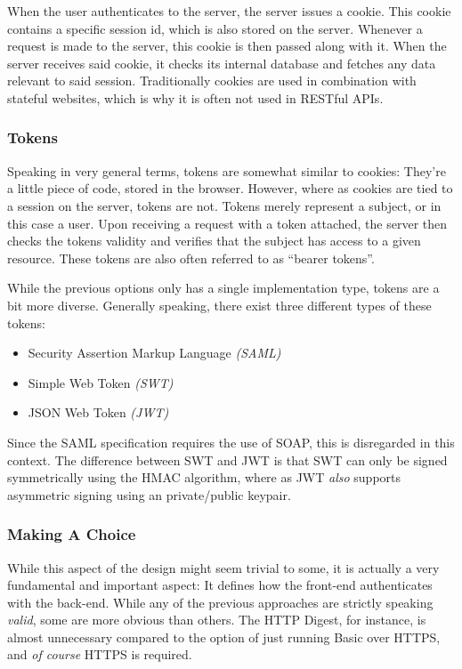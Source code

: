 				When the user authenticates to the server, the server issues a cookie. This cookie contains a specific session id, which is also stored on the server. Whenever a request is made to the server, this cookie is then passed along with it. When the server receives said cookie, it checks its internal database and fetches any data relevant to said session. Traditionally cookies are used in combination with stateful websites, which is why it is often not used in RESTful APIs.

			\subsubsection{Tokens}
				Speaking in very general terms, tokens are somewhat similar to cookies: They're a little piece of code, stored in the browser. However, where as cookies are tied to a session on the server, tokens are not. Tokens merely represent a subject, or in this case a user. Upon receiving a request with a token attached, the server then checks the tokens validity and verifies that the subject has access to a given resource. These tokens are also often referred to as ``bearer tokens''.

				While the previous options only has a single implementation type, tokens are a bit more diverse. Generally speaking, there exist three different types of these tokens:
				\begin{itemize}
					\item Security Assertion Markup Language \emph{(SAML)}
					\item Simple Web Token \emph{(SWT)}
					\item JSON Web Token \emph{(JWT)}
				\end{itemize}
				Since the SAML specification requires the use of SOAP, this is disregarded in this context. The difference between SWT and JWT is that SWT can only be signed symmetrically using the HMAC algorithm, where as JWT \emph{also} supports asymmetric signing using an private/public keypair\cite{auth0_jwt}.

			\subsubsection{Making A Choice}
				\label{sec:design:jwt}
				While this aspect of the design might seem trivial to some, it is actually a very fundamental and important aspect: It defines how the front-end authenticates with the back-end. While any of the previous approaches are strictly speaking \emph{valid}, some are more obvious than others. The HTTP Digest, for instance, is almost unnecessary compared to the option of just running Basic over HTTPS, and \emph{of course} HTTPS is required.

